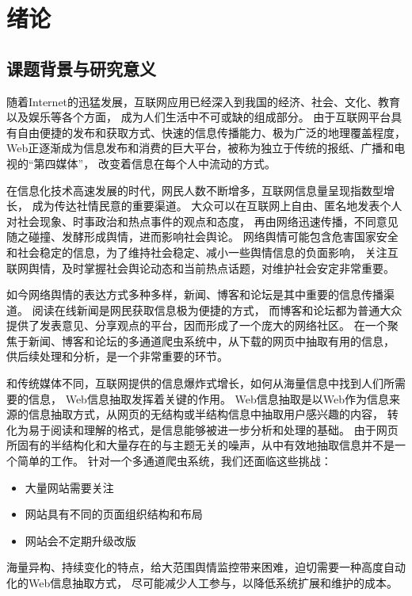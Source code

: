 \iffalse  \fi

\chapter{绪论}
\label{ch:introduction}

\section{课题背景与研究意义}
随着Internet的迅猛发展，互联网应用已经深入到我国的经济、社会、文化、教育以及娱乐等各个方面，
成为人们生活中不可或缺的组成部分。
由于互联网平台具有自由便捷的发布和获取方式、快速的信息传播能力、极为广泛的地理覆盖程度，
Web正逐渐成为信息发布和消费的巨大平台，被称为独立于传统的报纸、广播和电视的“第四媒体”，
改变着信息在每个人中流动的方式。

在信息化技术高速发展的时代，网民人数不断增多，互联网信息量呈现指数型增长，
成为传达社情民意的重要渠道。
大众可以在互联网上自由、匿名地发表个人对社会现象、时事政治和热点事件的观点和态度，
再由网络迅速传播，不同意见随之碰撞、发酵形成舆情，进而影响社会舆论。
网络舆情可能包含危害国家安全和社会稳定的信息，为了维持社会稳定、减小一些舆情信息的负面影响，
关注互联网舆情，及时掌握社会舆论动态和当前热点话题，对维护社会安定非常重要。

如今网络舆情的表达方式多种多样，新闻、博客和论坛是其中重要的信息传播渠道。
阅读在线新闻是网民获取信息极为便捷的方式，
而博客和论坛都为普通大众提供了发表意见、分享观点的平台，因而形成了一个庞大的网络社区。
在一个聚焦于新闻、博客和论坛的多通道爬虫系统中，从下载的网页中抽取有用的信息，
供后续处理和分析，是一个非常重要的环节。

和传统媒体不同，互联网提供的信息爆炸式增长，如何从海量信息中找到人们所需要的信息，
Web信息抽取发挥着关键的作用。
Web信息抽取是以Web作为信息来源的信息抽取方式，从网页的无结构或半结构信息中抽取用户感兴趣的内容，
转化为易于阅读和理解的格式，是信息能够被进一步分析和处理的基础。
由于网页所固有的半结构化和大量存在的与主题无关的噪声，从中有效地抽取信息并不是一个简单的工作。
针对一个多通道爬虫系统，我们还面临这些挑战：
\begin{itemize}
\item 大量网站需要关注
\item 网站具有不同的页面组织结构和布局
\item 网站会不定期升级改版
\end{itemize}
海量异构、持续变化的特点，给大范围舆情监控带来困难，迫切需要一种高度自动化的Web信息抽取方式，
尽可能减少人工参与，以降低系统扩展和维护的成本。

